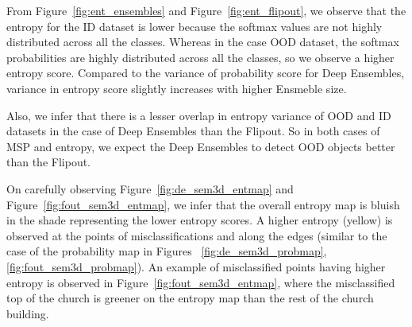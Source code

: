     From Figure~\ref{fig:ent_ensembles} and Figure~\ref{fig:ent_flipout}, we observe that the entropy for the ID dataset is lower because the softmax values are not highly distributed across all the classes.
    Whereas in the case OOD dataset, the softmax probabilities are highly distributed across all the classes, so we observe a higher entropy score.    
    Compared to the variance of probability score for Deep Ensembles, variance in entropy score slightly increases with higher Ensmeble size.

    Also, we infer that there is a lesser overlap in entropy variance of OOD and ID datasets in the case of Deep Ensembles than the Flipout.
    So in both cases of MSP and entropy, we expect the Deep Ensembles to detect OOD objects better than the Flipout.

    On carefully observing Figure~\ref{fig:de_sem3d_entmap} and Figure~\ref{fig:fout_sem3d_entmap}, we infer that the overall entropy map is bluish in the shade representing the lower entropy scores.
    A higher entropy (yellow) is observed at the points of misclassifications and along the edges (similar to the case of the probability map in Figures ~\ref{fig:de_sem3d_probmap}, \ref{fig:fout_sem3d_probmap}).
    An example of misclassified points having higher entropy is observed in Figure~\ref{fig:fout_sem3d_entmap}, where the misclassified top of the church is greener on the entropy map than the rest of the church building.
    
